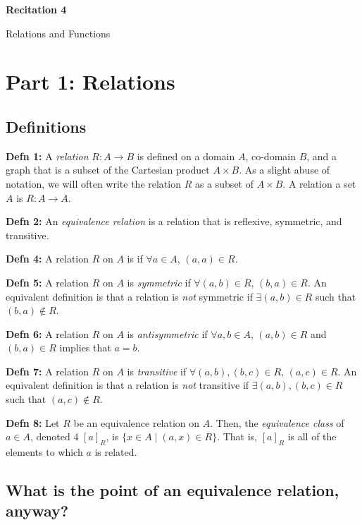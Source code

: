 \documentclass[12pt,letterpaper]{article}
\begin{document}
  \thispagestyle{firstpagestyle}
  \begin{center}
    {\large \textbf{Recitation 4}}
    
    {\large Relations and Functions}

  \end{center}

\section*{Part 1: Relations}

	\subsection*{Definitions}

\textbf{Defn 1:} A \textit{relation} $R:A \rightarrow B$ is defined on a domain $A$, co-domain $B$, and a graph that is a subset of the Cartesian product $A \times B$. As a slight abuse of notation, we will often write the relation $R$ as a subset of $A\times B$. A relation  a set $A$ is $R:A \rightarrow A$. 

\textbf{Defn 2:} An \textit{equivalence relation} is a relation that is reflexive, symmetric, and transitive.

\textbf{Defn 4:} A relation $R$ on $A$ is  if $\forall a \in A$, $(a, a) \in R$.

\textbf{Defn 5:} A relation $R$ on $A$ is \textit{symmetric} if $\forall (a, b) \in R$, $(b, a) \in R$. An equivalent definition is that a relation is \textit{not} symmetric if $ \exists (a, b) \in R$ such that $(b, a) \notin R$.

\textbf{Defn 6:} A relation $R$ on $A$ is \textit{antisymmetric} if $\forall a, b \in A$, $(a, b) \in R$ and $(b, a) \in R$ implies that $a = b$.

\textbf{Defn 7:} A relation $R$ on $A$ is \textit{transitive} if $\forall (a, b), (b, c) \in R$, $(a, c) \in R$. An equivalent definition is that a relation is \textit{not} transitive if $ \exists (a, b), (b, c) \in R$ such that $(a, c) \notin R$.

\textbf{Defn 8:} Let $R$ be an equivalence relation on $A$. Then, the \textit{equivalence class} of $a \in A$, denoted $4$ $\left[a\right]_R$,
is $\{x\in A \mid (a, x) \in R\}$. That is, 
$\left[a\right]_R$ is all of the elements to which $a$ is related.

\subsection*{What is the point of an equivalence relation, anyway?}
\end{document}
